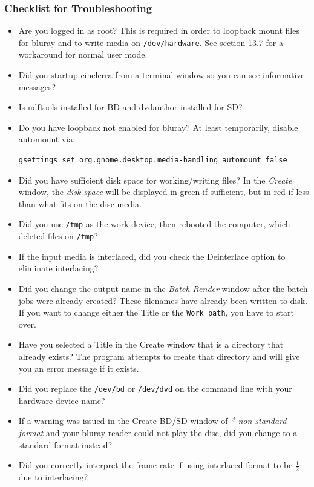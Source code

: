 \subsubsection*{Checklist for Troubleshooting}
\label{ssub:checklist_troubleshooting}

\begin{itemize}
    \item Are you logged in as root?  This is required in order to loopback mount files for bluray and to write media on \texttt{/dev/hardware}.  See section 13.7 for a workaround for normal user mode.
    \item Did you startup cinelerra from a terminal window so you can see informative messages?
    \item Is udftools installed for BD and dvdauthor installed for SD?
    \item Do you have loopback not enabled for bluray?  At least temporarily, disable automount via:
    \begin{lstlisting}[language=bash]
    gsettings set org.gnome.desktop.media-handling automount false
    \end{lstlisting}
    \item Did you have sufficient disk space for working/writing files?  In the \textit{Create} window, the \textit{disk space} will be displayed in green if sufficient, but in red if less than what fits on the disc media.
    \item Did you use \texttt{/tmp} as the work device, then rebooted the computer, which deleted files on \texttt{/tmp}?
    \item If the input media is interlaced, did you check the Deinterlace option to eliminate interlacing?
    \item Did you change the output name in the \textit{Batch Render} window after the batch jobs were already created? These filenames have already been written to disk. If you want to change either the Title or the \texttt{Work\_path}, you have to start over.
    \item Have you selected a Title in the Create window that is a directory that already exists? The program attempts to create that directory and will give you an error message if it exists.
    \item Did you replace the \texttt{/dev/bd} or \texttt{/dev/dvd} on the command line with your hardware device name?
    \item If a warning was issued in the Create BD/SD window of \textit{* non-standard format} and your bluray reader could not play the disc, did you change to a standard format instead?
    \item Did you correctly interpret the frame rate if using interlaced format to be $\frac{1}{2}$ due to interlacing?
\end{itemize}

